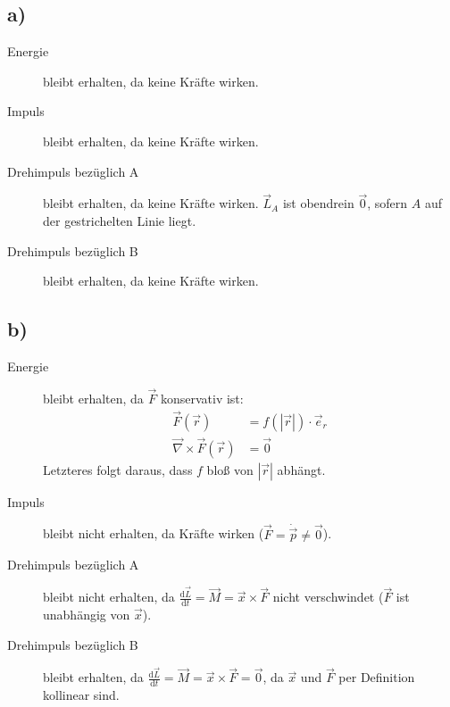 \documentclass[12pt,a4paper,notitlepage]{article}
\newcommand{\diff}{\mathrm{d}}
\begin{document}
\subsection*{a)}
\begin{description}
\item[Energie] bleibt erhalten, da keine Kräfte wirken.
\item[Impuls] bleibt erhalten, da keine Kräfte wirken.
\item[Drehimpuls bezüglich A] bleibt erhalten, da keine Kräfte wirken. $\vec L_A$ ist obendrein $\vec 0$, sofern $A$ auf der gestrichelten Linie liegt.
\item[Drehimpuls bezüglich B] bleibt erhalten, da keine Kräfte wirken.
\end{description}
\subsection*{b)}
\begin{description}
\item[Energie] bleibt erhalten, da $\vec F$ konservativ ist:
\begin{align}
\vec F(\vec r)&=f\left(\left|\vec r\right|\right)\cdot\vec e_r\\
\vec\nabla\times\vec F\left(\vec r\right)&=\vec 0
\end{align}
Letzteres folgt daraus, dass $f$ bloß von $\left|\vec r\right|$ abhängt.
\item[Impuls] bleibt nicht erhalten, da Kräfte wirken ($\vec F=\dot\vec p\neq\vec 0$).
\item[Drehimpuls bezüglich A] bleibt nicht erhalten, da $\frac{\diff\vec L}{\diff t}=\vec M=\vec x\times\vec F$ nicht verschwindet ($\vec F$ ist unabhängig von $\vec x$).
\item[Drehimpuls bezüglich B] bleibt erhalten, da $\frac{\diff\vec L}{\diff t}=\vec M=\vec x\times\vec F=\vec 0$, da $\vec x$ und $\vec F$ per Definition kollinear sind.
\end{description}
\end{document}
